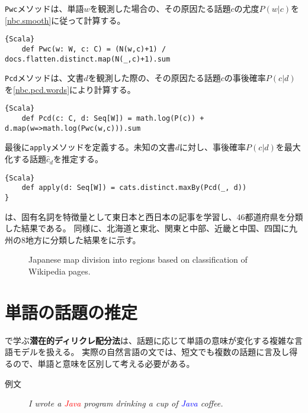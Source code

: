 \documentclass[10pt,a4paper]{book}
\begin{document}
\texttt{Pwc}メソッドは、単語$w$を観測した場合の、その原因たる話題$c$の尤度$P(w|c)$を\eqref{nbc.smooth}に従って計算する。

\begin{Verbatim}{Scala}
	def Pwc(w: W, c: C) = (N(w,c)+1) / docs.flatten.distinct.map(N(_,c)+1).sum
\end{Verbatim}

\texttt{Pcd}メソッドは、文書$d$を観測した際の、その原因たる話題$c$の事後確率$P(c|d)$を\eqref{nbc.pcd.words}により計算する。

\begin{Verbatim}{Scala}
	def Pcd(c: C, d: Seq[W]) = math.log(P(c)) + d.map(w=>math.log(Pwc(w,c))).sum
\end{Verbatim}

最後に\texttt{apply}メソッドを定義する。未知の文書$d$に対し、事後確率$P(c|d)$を最大化する話題$\hat{c}_d$を推定する。

\begin{Verbatim}{Scala}
	def apply(d: Seq[W]) = cats.distinct.maxBy(Pcd(_, d))
}
\end{Verbatim}

は、固有名詞を特徴量として東日本と西日本の記事を学習し、46都道府県を分類した結果である。
同様に、北海道と東北、関東と中部、近畿と中国、四国に九州の8地方に分類した結果をに示す。

\begin{figure}[h]
\centering
{}
\caption{Japanese map division into regions based on classification of Wikipedia pages.\label{fig:nbc.jmap}}
\end{figure}

\section{単語の話題の推定\label{sect:topic.lda}}

で学ぶ\textbf{潜在的ディリクレ配分法}は、話題に応じて単語の意味が変化する複雑な言語モデルを扱える。
実際の自然言語の文では、短文でも複数の話題に言及し得るので、単語と意味を区別して考える必要がある。

\begin{description}
\item[例文]\textit{I wrote a \textcolor{red}{Java} program drinking a cup of \textcolor{blue}{Java} coffee.}
\end{description}
\end{document}
